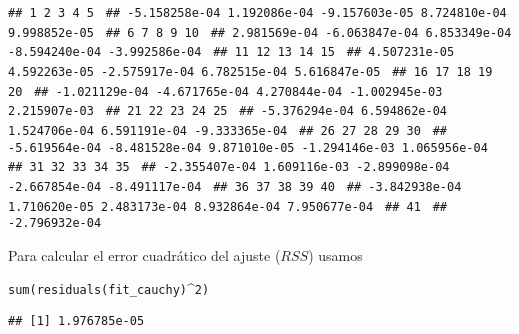 \documentclass[
  title=normal,
  notoc,
  bib=normal]{mnye}
\newenvironment{Shaded}{\begin{snugshade}}{\end{snugshade}}
\newcommand{\DecValTok}[1]{\textcolor[rgb]{0.00,0.00,0.81}{#1}}
\newcommand{\FunctionTok}[1]{\textcolor[rgb]{0.00,0.00,0.00}{#1}}
\newcommand{\NormalTok}[1]{#1}
\newcommand{\SpecialCharTok}[1]{\textcolor[rgb]{0.00,0.00,0.00}{#1}}
\renewcommand{\DecValTok}[1]{\textcolor[RGB]{64, 160, 112}{\texttt{#1}}}
\renewcommand{\FunctionTok}[1]{\textcolor[rgb]{0.13,0.29,0.53}{\texttt{#1}}}
\renewcommand{\NormalTok}[1]{\texttt{#1}}
\begin{document}
\begin{Shaded}
\begin{Highlighting}[]
\NormalTok{\#\#             1             2             3             4             5 }
\NormalTok{\#\# {-}5.158258e{-}04  1.192086e{-}04 {-}9.157603e{-}05  8.724810e{-}04  9.998852e{-}05 }
\NormalTok{\#\#             6             7             8             9            10 }
\NormalTok{\#\#  2.981569e{-}04 {-}6.063847e{-}04  6.853349e{-}04 {-}8.594240e{-}04 {-}3.992586e{-}04 }
\NormalTok{\#\#            11            12            13            14            15 }
\NormalTok{\#\#  4.507231e{-}05  4.592263e{-}05 {-}2.575917e{-}04  6.782515e{-}04  5.616847e{-}05 }
\NormalTok{\#\#            16            17            18            19            20 }
\NormalTok{\#\# {-}1.021129e{-}04 {-}4.671765e{-}04  4.270844e{-}04 {-}1.002945e{-}03  2.215907e{-}03 }
\NormalTok{\#\#            21            22            23            24            25 }
\NormalTok{\#\# {-}5.376294e{-}04  6.594862e{-}04  1.524706e{-}04  6.591191e{-}04 {-}9.333365e{-}04 }
\NormalTok{\#\#            26            27            28            29            30 }
\NormalTok{\#\# {-}5.619564e{-}04 {-}8.481528e{-}04  9.871010e{-}05 {-}1.294146e{-}03  1.065956e{-}04 }
\NormalTok{\#\#            31            32            33            34            35 }
\NormalTok{\#\# {-}2.355407e{-}04  1.609116e{-}03 {-}2.899098e{-}04 {-}2.667854e{-}04 {-}8.491117e{-}04 }
\NormalTok{\#\#            36            37            38            39            40 }
\NormalTok{\#\# {-}3.842938e{-}04  1.710620e{-}05  2.483173e{-}04  8.932864e{-}04  7.950677e{-}04 }
\NormalTok{\#\#            41 }
\NormalTok{\#\# {-}2.796932e{-}04}
\end{Highlighting}
\end{Shaded}

Para calcular el error cuadrático del ajuste (\(RSS\)) usamos

\begin{Shaded}
\begin{Highlighting}[]
\FunctionTok{sum}\NormalTok{(}\FunctionTok{residuals}\NormalTok{(fit\_cauchy)}\SpecialCharTok{\^{}}\DecValTok{2}\NormalTok{)}
\end{Highlighting}
\end{Shaded}

\begin{Shaded}
\begin{Highlighting}[]
\NormalTok{\#\# [1] 1.976785e{-}05}
\end{Highlighting}
\end{Shaded}
\end{document}
